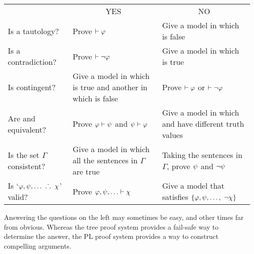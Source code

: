 \begin{table}[h]
\begin{center}
\begin{tabular*}{\textwidth}{p{12em}|p{10em}|p{12em}|}
\cline{2-3}

 & \multicolumn{1}{|c|}{YES} & \multicolumn{1}{|c|}{NO}\\
\cline{2-3}

Is \metaA{} a tautology? & Prove $\vdash\varphi{}$ & Give a model in which \metaA{} is false\\
\cline{2-3}

Is \metaA{} a contradiction? &  Prove $\vdash\neg\varphi{}$ & Give a model in which \metaA{} is true\\
\cline{2-3}

Is \metaA{} contingent? & Give a model in which \metaA{} is true and another in which \metaA{} is false & Prove $\vdash\varphi{}$ or $\vdash\neg\varphi{}$\\
\cline{2-3}

Are \metaA{} and \metaB{} equivalent? & Prove \mbox{$\varphi{}\vdash\psi{}$} and \mbox{$\psi{}\vdash\varphi{}$}  & Give a model in which \metaA{} and \metaB{} have different truth values\\
\cline{2-3}

Is the set $\Gamma$ consistent? & Give a model in which all the sentences in $\Gamma$ are true & Taking the sentences in $\Gamma$, prove $\psi$ and $\neg\psi$\\
\cline{2-3}

Is `$\varphi, \psi, \ldots\ \ldotp\dot{}\,\ldotp\ \chi$' valid? & Prove $\varphi{}, \psi{}, \ldots \vdash\chi{}$ & Give a model that satisfies $\lbrace\varphi, \psi, \ldots,\ \neg \chi\rbrace$\\
\cline{2-3}
\end{tabular*}
\end{center}
\label{table.ProofOrModel}
\end{table}

Answering the questions on the left may sometimes be easy, and other times far from obvious.
Whereas the tree proof system provides a fail-safe way to determine the answer, the PL proof system provides a way to construct compelling arguments.





